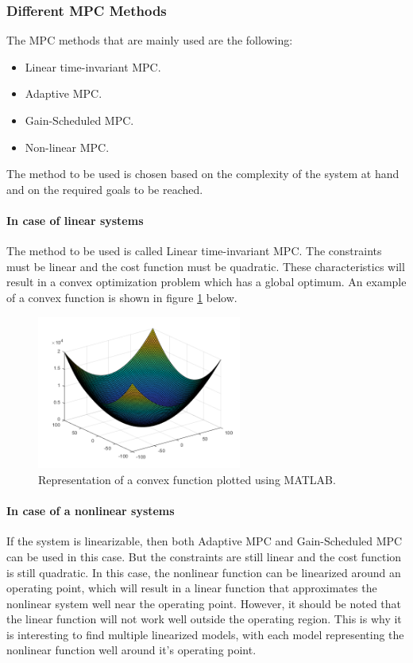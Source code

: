 \documentclass{thesisreport}
\begin{document}
\newpage


\subsubsection{Different MPC Methods}
The MPC methods that are mainly used are the following:

\begin{itemize}
	\item Linear time-invariant MPC.
	\item Adaptive MPC.
	\item Gain-Scheduled MPC.
	\item Non-linear MPC.
\end{itemize} 

\noindent The method to be used is chosen based on the complexity of the system at hand and on the required goals to be reached. 

\paragraph{In case of linear systems} The method to be used is called Linear time-invariant MPC. The constraints must be linear and the cost function must be quadratic. These characteristics will result in a convex optimization problem \cite{ZEMAN2003325} which has a global optimum. An example of a convex function is shown in figure \ref{convex_function} below.

\begin{figure}[h]
\centering
\includegraphics[width=0.6\textwidth]{Images/Control/MPC_Convex_Equation}
\caption{Representation of a convex function plotted using MATLAB.}
\label{convex_function}
\end{figure}

\paragraph{In case of a nonlinear systems} If the system is linearizable, then both Adaptive MPC and Gain-Scheduled MPC can be used in this case. But the constraints are still linear and the cost function is still quadratic. In this case, the nonlinear function can be linearized around an operating point, which will result in a linear function that approximates the nonlinear system well near the operating point. However, it should be noted that the linear function will not work well outside the operating region. This is why it is interesting to find multiple linearized models, with each model representing the nonlinear function well around it's operating point.
\end{document}
